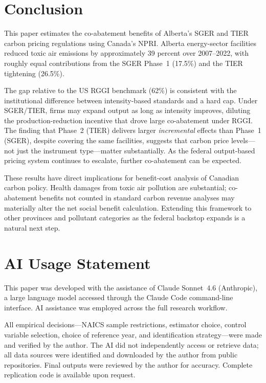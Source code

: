 \documentclass[12pt]{article}
\begin{document}
\section{Conclusion}

This paper estimates the co-abatement benefits of Alberta's SGER and
TIER carbon pricing regulations using Canada's NPRI.
Alberta energy-sector facilities reduced toxic air emissions by approximately
39 percent over 2007--2022, with roughly equal contributions from the
SGER Phase~1 (17.5\%) and the TIER tightening (26.5\%).

The gap relative to the US RGGI benchmark (62\%) is consistent with the
institutional difference between intensity-based standards and a hard cap.
Under SGER/TIER, firms may expand output as long as intensity improves,
diluting the production-reduction incentive that drove large co-abatement
under RGGI.
The finding that Phase~2 (TIER) delivers larger \textit{incremental} effects
than Phase~1 (SGER), despite covering the same facilities, suggests that
carbon price levels---not just the instrument type---matter substantially.
As the federal output-based pricing system continues to escalate, further
co-abatement can be expected.

These results have direct implications for benefit-cost analysis of Canadian
carbon policy.
Health damages from toxic air pollution are substantial; co-abatement
benefits not counted in standard carbon revenue analyses may materially
alter the net social benefit calculation.
Extending this framework to other provinces and pollutant categories as
the federal backstop expands is a natural next step.

\section*{AI Usage Statement}

This paper was developed with the assistance of Claude Sonnet~4.6 (Anthropic),
a large language model accessed through the Claude Code command-line interface.
AI assistance was employed across the full research workflow.

All empirical decisions---NAICS sample restrictions, estimator choice,
control variable selection, choice of reference year, and identification
strategy---were made and verified by the author.
The AI did not independently access or retrieve data; all data sources were
identified and downloaded by the author from public repositories.
Final outputs were reviewed by the author for accuracy.
Complete replication code is available upon request.
\end{document}
